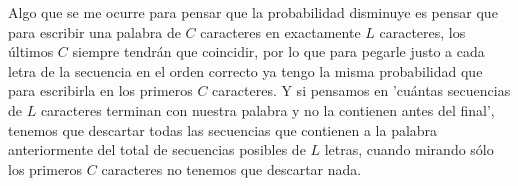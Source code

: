 \documentclass[a4paper]{article}
\begin{document}
Algo que se me ocurre para pensar que la probabilidad disminuye es pensar que para escribir una palabra de $C$ caracteres en exactamente $L$ caracteres, los últimos $C$ siempre tendrán que coincidir, por lo que para pegarle justo a cada letra de la secuencia en el orden correcto ya tengo la misma probabilidad que para escribirla en los primeros $C$ caracteres. Y si pensamos en 'cuántas secuencias de $L$ caracteres terminan con nuestra palabra y no la contienen antes del final', tenemos que descartar todas las secuencias que contienen a la palabra anteriormente del total de secuencias posibles de $L$ letras, cuando mirando sólo los primeros $C$ caracteres no tenemos que descartar nada.
\end{document}
